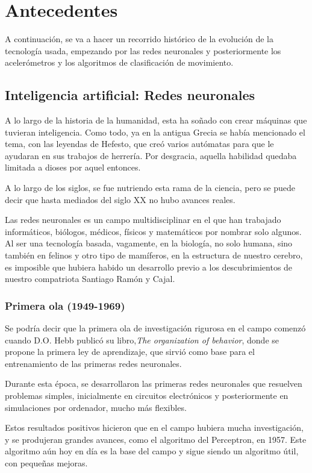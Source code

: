 \documentclass[12pt]{book}
\numberwithin{equation}{section}
\begin{document}
\chapter{Antecedentes}
A continuación, se va a hacer un recorrido histórico de la evolución de la tecnología usada, empezando por las redes neuronales y posteriormente los acelerómetros y los algoritmos de clasificación de movimiento.
\section{Inteligencia artificial: Redes neuronales}
A lo largo de la historia de la humanidad, esta ha soñado con crear máquinas que tuvieran inteligencia. Como todo, ya en la antigua Grecia se había mencionado el tema, con las leyendas de Hefesto, que creó varios autómatas para que le ayudaran en sus trabajos de herrería. Por  desgracia, aquella habilidad quedaba limitada a dioses por aquel entonces.

A lo largo de los siglos, se fue nutriendo esta rama de la ciencia, pero se puede decir que hasta mediados del siglo XX no hubo avances reales.

Las redes neuronales es un campo multidisciplinar en el que han trabajado informáticos, biólogos, médicos, físicos y matemáticos por nombrar solo algunos. Al ser una tecnología basada, vagamente, en la biología, no solo humana, sino también en felinos y otro tipo de mamíferos, en la estructura de nuestro cerebro, es imposible que hubiera habido un desarrollo previo a los descubrimientos de nuestro compatriota Santiago Ramón y Cajal.

\subsection{Primera ola (1949-1969)}

Se podría decir que la primera ola de investigación rigurosa en el campo comenzó cuando D.O. Hebb publicó su libro,\textit{The organization of behavior}, donde se propone la primera ley de aprendizaje, que sirvió como base para el entrenamiento de las primeras redes neuronales.

Durante esta época, se desarrollaron las primeras redes neuronales que resuelven problemas simples, inicialmente en circuitos electrónicos y posteriormente en simulaciones por ordenador, mucho más flexibles.

Estos resultados positivos hicieron que en el campo hubiera mucha investigación, y se produjeran grandes avances, como el algoritmo del Perceptron, en 1957\cite{rosenblatt1957perceptron}. Este algoritmo aún hoy en día es la base del campo y sigue siendo un algoritmo útil, con pequeñas mejoras.
\end{document}
